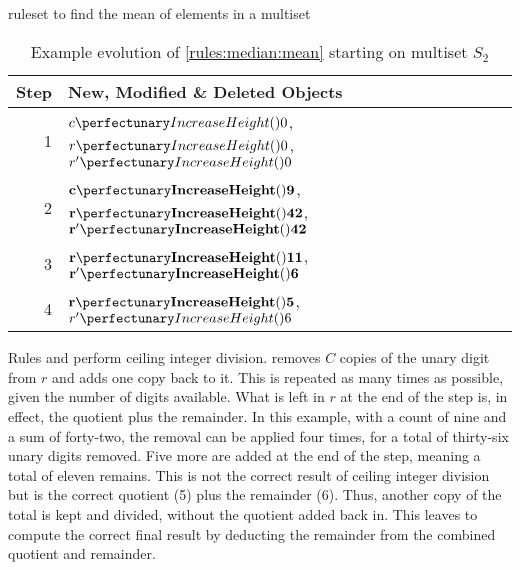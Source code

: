\begin{cprulesetfloat}
\begin{cpruleset}




\end{cpruleset}
\caption{\label{rules:median:mean}\Gls{ruleset} to find the mean of elements in a multiset}
\end{cprulesetfloat}

\begin{table}[htbp]
\centering
  \begin{tabular}{|r|l|}
    \hline
    \textbf{Step} & \textbf{New, Modified \& Deleted Objects} \\ \hline
    1 & \(\cpfunc{c}{0}\), \(\cpfunc{r}{0}\), \(\cpfunc{r'}{0}\)\\ \hline
    2 & \(\mathbf{\cpfunc{c}{9}}\), \(\mathbf{\cpfunc{r}{42}}\), \(\mathbf{\cpfunc{r'}{42}}\)\\ \hline
    3 & \(\mathbf{\cpfunc{r}{11}}\), \(\mathbf{\cpfunc{r'}{6}}\)\\ \hline
    4 & \(\mathbf{\cpfunc{r}{5}}\), \sout{\(\cpfunc{r'}{6}\)}\\ \hline

\end{tabular}
\caption[Example evolution of \cref{rules:median:mean} to find the mean of elements in a multiset]{\label{tab:median:mean}Example evolution of \cref{rules:median:mean} starting on multiset \(S_2\)}
\end{table}

Rules  and  perform ceiling integer division.   removes \(C\) copies of the unary digit from \(r\) and adds one copy back to it.  This is repeated as many times as possible, given the number of digits available.  What is left in \(r\) at the end of the step is, in effect, the quotient plus the remainder.  In this example, with a count of nine and a sum of forty-two, the removal can be applied four times, for a total of thirty-six unary digits removed.  Five more are added at the end of the step, meaning a total of eleven remains.  This is not the correct result of ceiling integer division but is the correct quotient (5) plus the remainder (6).  Thus, another copy of the total is kept and divided, without the quotient added back in.  This leaves  to compute the correct final result by deducting the remainder from the combined quotient and remainder.

